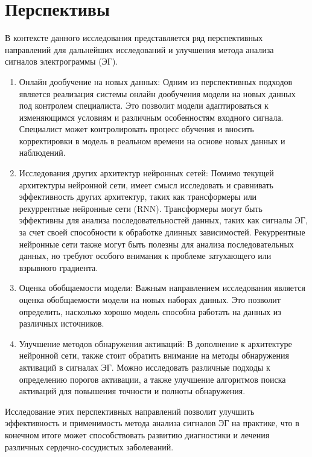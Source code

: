 \section{Перспективы}

В контексте данного исследования представляется ряд перспективных направлений
для дальнейших исследований и улучшения метода анализа сигналов
электрограммы (ЭГ).

\begin{enumerate}

	\item Онлайн дообучение на новых данных: Одним из перспективных подходов
	является реализация системы онлайн дообучения модели на новых данных под
	контролем специалиста. Это позволит модели адаптироваться к изменяющимся
	условиям и различным особенностям входного сигнала. Специалист может
	контролировать процесс обучения и вносить корректировки в модель в реальном
	времени на основе новых данных и наблюдений.

	\item Исследования других архитектур нейронных сетей: Помимо текущей
	архитектуры нейронной сети, имеет смысл исследовать и сравнивать
	эффективность других архитектур, таких как трансформеры или рекуррентные
	нейронные сети (RNN). Трансформеры могут быть эффективны для анализа
	последовательностей данных, таких как сигналы ЭГ, за счет своей
	способности к обработке длинных зависимостей. Рекуррентные нейронные сети
	также могут быть полезны для анализа последовательных данных, но требуют
	особого внимания к проблеме затухающего или взрывного градиента.

	\item Оценка обобщаемости модели: Важным направлением исследования является
	оценка обобщаемости модели на новых наборах данных. Это позволит
	определить, насколько хорошо модель способна работать на данных из
	различных источников.

	\item Улучшение методов обнаружения активаций: В дополнение к архитектуре
	нейронной сети, также стоит обратить внимание на методы обнаружения
	активаций в сигналах ЭГ. Можно исследовать различные подходы к определению
	порогов активации, а также улучшение алгоритмов поиска активаций для
	повышения точности и полноты обнаружения.

\end{enumerate}

Исследование этих перспективных направлений позволит улучшить эффективность и
применимость метода анализа сигналов ЭГ на практике, что в конечном итоге может
способствовать развитию диагностики и лечения различных сердечно-сосудистых
заболеваний.
